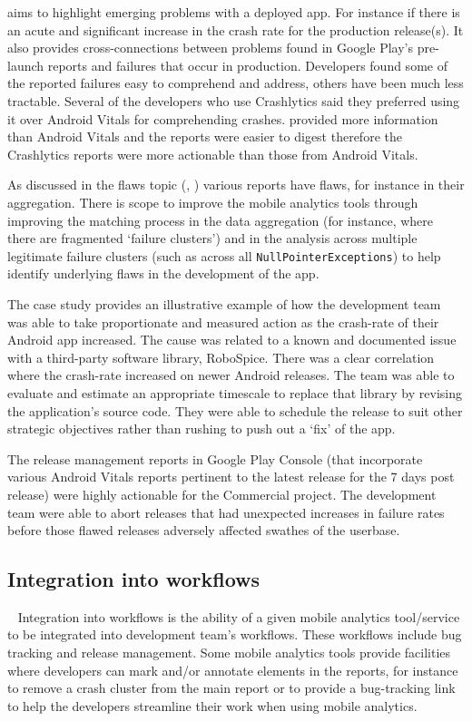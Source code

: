  aims to highlight emerging problems with a deployed app. For instance if there is an acute and significant increase in the crash rate for the production release(s). It also provides cross-connections between problems found in Google Play's pre-launch reports and failures that occur in production. Developers found some of the reported failures easy to comprehend and address, others have been much less tractable. Several of the developers who use Crashlytics said they preferred using it over Android Vitals for comprehending crashes.  provided more information than Android Vitals and the reports were easier to digest therefore the Crashlytics reports were more actionable than those from Android Vitals.

As discussed in the flaws topic (, ) various reports have flaws, for instance in their aggregation. There is scope to improve the mobile analytics tools through improving the matching process in the data aggregation (for instance, where there are fragmented `failure clusters') and in the analysis across multiple legitimate failure clusters (such as across all \texttt{NullPointerExceptions}) to help identify underlying flaws in the development of the app.

The  case study provides an illustrative example of how the development team was able to take proportionate and measured action as the crash-rate of their Android app increased. The cause was related to a known and documented issue with a third-party software library, RoboSpice. There was a clear correlation where the crash-rate increased on newer Android releases. The team was able to evaluate and estimate an appropriate timescale to replace that library by revising the application's source code. They were able to schedule the release to suit other strategic objectives rather than rushing to push out a `fix' of the app.

The release management reports in Google Play Console (that incorporate various Android Vitals reports pertinent to the latest release for the 7 days post release) were highly actionable for the Commercial project. The development team were able to abort releases that had unexpected increases in failure rates before those flawed releases adversely affected swathes of the userbase.

\subsection{Integration into workflows}~\label{tata-integration-into-workflows-topic}
Integration into workflows is the ability of a given mobile analytics tool/service to be integrated into development team's workflows. These workflows include bug tracking and release management. Some mobile analytics tools provide facilities where developers can mark and/or annotate elements in the reports, for instance to remove a crash cluster from the main report or to provide a bug-tracking link to help the developers streamline their work when using mobile analytics.

